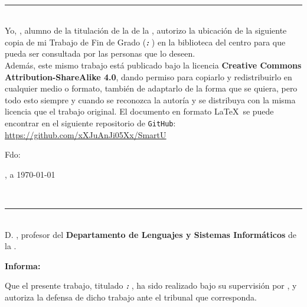 {{\newpage
\thispagestyle{empty}
\
\vspace{3cm}

\noindent\rule[-1ex]{\textwidth}{2pt}\\[4.5ex]

Yo, \textbf{\autor}, alumno de la titulación \textbf{\grado} de la \textbf{\escuela} de la \textbf{\universidad}, autorizo la ubicación de la siguiente copia de mi Trabajo de Fin de Grado (\textbf{\textit{\titulo: \subtitulo}}) en la biblioteca del centro para que pueda ser consultada por las personas que lo deseen. \\

Además, este mismo trabajo está publicado bajo la licencia \textbf{Creative Commons Attribution-ShareAlike 4.0}, dando permiso para copiarlo y redistribuirlo en cualquier medio o formato, también de adaptarlo de la forma que se quiera, pero todo esto siempre y cuando se reconozca la autoría y se distribuya con la misma licencia que el trabajo original. El documento en formato \LaTeX\ se puede encontrar en el siguiente repositorio de {\tt GitHub}: \url{https://github.com/xXJuAnJi05Xx/SmartU}

\vspace{4cm}

\noindent Fdo: \autor

\vspace{2cm}

\begin{flushright}
\ciudad, a \today
\end{flushright}

\newpage
\thispagestyle{empty}
\
\vspace{3cm}

\noindent\rule[-1ex]{\textwidth}{2pt}\\[4.5ex]

D. \textbf{\tutor}, profesor del \textbf{Departamento de Lenguajes y Sistemas Informáticos} de la \textbf{\universidad}.

\vspace{0.5cm}

\textbf{Informa:}

\vspace{0.5cm}

Que el presente trabajo, titulado \textit{\textbf{\titulo: \subtitulo}}, ha sido realizado bajo su supervisión por \textbf{\autor}, y autoriza la defensa de dicho trabajo ante el tribunal que corresponda.

\vspace{0.5cm}

}}

